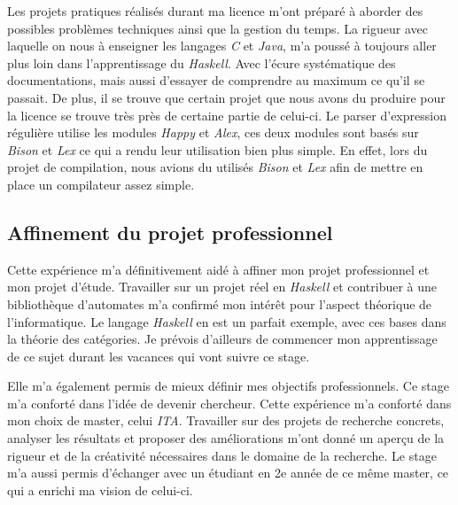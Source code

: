 \vphantom{}

Les projets pratiques réalisés durant ma licence m'ont préparé à aborder des 
possibles problèmes techniques ainsi que la gestion du temps. La rigueur avec 
laquelle on nous à enseigner les langages \textit{C} et \textit{Java}, m’a 
poussé à toujours aller plus loin dans l'apprentissage du \textit{Haskell}. Avec 
l’écure systématique des documentations, mais aussi d'essayer de comprendre au 
maximum ce qu'il se passait. De plus, il se trouve que certain projet que nous 
avons du produire pour la licence se trouve très près de certaine partie de 
celui-ci. Le parser d'expression régulière utilise les modules \textit{Happy} et 
\textit{Alex}, ces deux modules sont basés sur \textit{Bison} et \textit{Lex} ce 
qui a rendu leur utilisation bien plus simple. En effet, lors du projet de 
compilation, nous avions du utilisés \textit{Bison} et \textit{Lex} afin de 
mettre en place un compilateur assez simple. 

\subsection{Affinement du projet professionnel}

Cette expérience m'a définitivement aidé à affiner mon projet professionnel et 
mon projet d'étude. Travailler sur un projet réel en \textit{Haskell} et 
contribuer à une bibliothèque d'automates m'a confirmé mon intérêt pour l'aspect 
théorique de l'informatique. Le langage \textit{Haskell} en est un parfait 
exemple, avec ces bases dans la théorie des catégories. Je prévois d'ailleurs de 
commencer mon apprentissage de ce sujet durant les vacances qui vont suivre ce 
stage.

\vphantom{}

Elle m'a également permis de mieux définir mes objectifs professionnels. Ce 
stage m'a conforté dans l'idée de devenir chercheur. Cette expérience m'a 
conforté dans mon choix de master, celui \textit{ITA}. Travailler sur des 
projets de recherche concrets, analyser les résultats et proposer des 
améliorations m'ont donné un aperçu de la rigueur et de la créativité 
nécessaires dans le domaine de la recherche. Le stage m'a aussi permis 
d'échanger avec un étudiant en 2e année de ce même master, ce qui a enrichi ma 
vision de celui-ci.